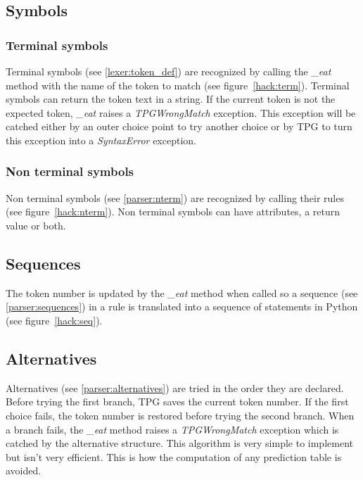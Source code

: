 
\clearpage
\subsection{Symbols}

\subsubsection{Terminal symbols}

Terminal symbols (see \ref{lexer:token_def}) are recognized by calling the \emph{\_eat} method with the name of the token to match (see figure~\ref{hack:term}).
Terminal symbols can return the token text in a string.
If the current token is not the expected token, \emph{\_eat} raises a \emph{TPGWrongMatch} exception.
This exception will be catched either by an outer choice point to try another choice or by TPG to turn this exception into a \emph{SyntaxError} exception.


\subsubsection{Non terminal symbols}

Non terminal symbols (see \ref{parser:nterm}) are recognized by calling their rules (see figure~\ref{hack:nterm}).
Non terminal symbols can have attributes, a return value or both.


\clearpage
\subsection{Sequences}
\label{hack:sequences}

The token number is updated by the \emph{\_eat} method when called so a sequence (see \ref{parser:sequences}) in a rule is translated into a sequence of statements in Python (see figure~\ref{hack:seq}).


\clearpage
\subsection{Alternatives}
\label{hack:alternatives}

Alternatives (see \ref{parser:alternatives}) are tried in the order they are declared.
Before trying the first branch, TPG saves the current token number.
If the first choice fails, the token number is restored before trying the second branch.
When a branch fails, the \emph{\_eat} method raises a \emph{TPGWrongMatch} exception which is catched by the alternative structure.
This algorithm is very simple to implement but isn't very efficient.
This is how the computation of any prediction table is avoided.

